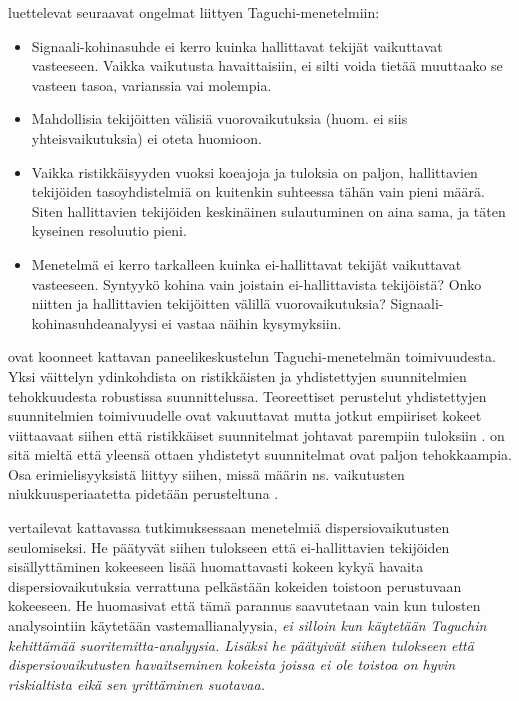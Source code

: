 \documentclass[12pt,a4paper,finnish]{tutthesis}
\begin{document}
\textcite[s.~300-301]{Hedayat2012} luettelevat
seuraavat ongelmat liittyen
Taguchi-menetelmiin:
\begin{itemize}
\item Signaali-kohinasuhde ei kerro kuinka hallittavat tekijät vaikuttavat
      vasteeseen. Vaikka vaikutusta havaittaisiin, ei silti voida tietää
      muuttaako se vasteen tasoa, varianssia vai molempia.
\item Mahdollisia tekijöitten välisiä vuorovaikutuksia (huom. ei siis yhteisvaikutuksia) ei oteta huomioon.
\item Vaikka ristikkäisyyden vuoksi koeajoja ja tuloksia on paljon, hallittavien tekijöiden
    tasoyhdistelmiä on kuitenkin suhteessa tähän vain pieni määrä. Siten hallittavien
    tekijöiden keskinäinen sulautuminen on aina sama, ja täten kyseinen resoluutio pieni.
\item Menetelmä ei kerro tarkalleen kuinka ei-hallittavat tekijät vaikuttavat vasteeseen.
      Syntyykö kohina vain joistain ei-hallittavista tekijöistä? Onko niitten ja
      hallittavien tekijöitten välillä vuorovaikutuksia? Signaali-kohinasuhdeanalyysi
      ei vastaa näihin kysymyksiin.
\end{itemize}

\textcite{nair1992} ovat koonneet kattavan paneelikeskustelun Taguchi-menetelmän
toimivuudesta. Yksi väittelyn ydinkohdista on ristikkäisten ja yhdistettyjen suunnitelmien
tehokkuudesta robustissa suunnittelussa.
Teoreettiset perustelut yhdistettyjen suunnitelmien toimivuudelle ovat
vakuuttavat mutta jotkut empiiriset kokeet viittaavaat siihen että
ristikkäiset suunnitelmat johtavat parempiin tuloksiin
\parencite{kunert2003experiment}.
\textcite[s.~558]{Montgomery2012} on sitä mieltä että yleensä ottaen yhdistetyt
suunnitelmat ovat paljon tehokkaampia.
Osa erimielisyyksistä liittyy siihen, missä määrin ns. vaikutusten
niukkuusperiaatetta pidetään perusteltuna \parencite{Li2006}.

\textcite{Bursztyn} vertailevat kattavassa tutkimuksessaan menetelmiä dispersiovaikutusten
seulomiseksi. He päätyvät siihen tulokseen että ei-hallittavien tekijöiden
sisällyttäminen kokeeseen lisää huomattavasti kokeen kykyä havaita
dispersiovaikutuksia verrattuna pelkästään kokeiden toistoon perustuvaan
kokeeseen. He huomasivat että tämä parannus saavutetaan vain
kun
tulosten analysointiin
käytetään vastemallianalyysia, \em ei silloin kun käytetään Taguchin kehittämää
suoritemitta-analyysia. \em
Lisäksi he päätyivät siihen tulokseen että dispersiovaikutusten
havaitseminen kokeista joissa ei ole toistoa on hyvin riskialtista eikä
sen yrittäminen suotavaa.
\end{document}
